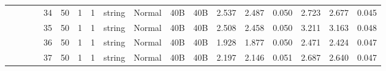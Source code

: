 \begin{landscape}
\begin{table}[]
{\begin{tabular}{@{}ccccllllllllllllll@{}}
                                                                                   &                              &                                &                                                                                                          & 34                                                    & 50                                       & 1                                          & 1                                 & string                           & Normal                             & 40B                                           & 40B                                             & 2.537                   & 2.487    & 0.050                        & 2.723                   & 2.677    & 0.045                        \\
                                                                                   &                              &                                &                                                                                                          & 35                                                    & 50                                       & 1                                          & 1                                 & string                           & Normal                             & 40B                                           & 40B                                             & 2.508                   & 2.458    & 0.050                        & 3.211                   & 3.163    & 0.048                        \\
                                                                                   &                              &                                &                                                                                                          & 36                                                    & 50                                       & 1                                          & 1                                 & string                           & Normal                             & 40B                                           & 40B                                             & 1.928                   & 1.877    & 0.050                        & 2.471                   & 2.424    & 0.047                        \\
                                                                                   &                              &                                &                                                                                                          & 37                                                    & 50                                       & 1                                          & 1                                 & string                           & Normal                             & 40B                                           & 40B                                             & 2.197                   & 2.146    & 0.051                        & 2.687                   & 2.640    & 0.047                        \\

\end{tabular}}
\end{table}
\end{landscape}
